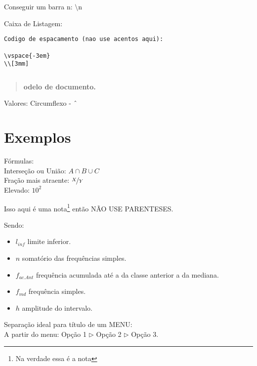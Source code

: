 \documentclass[a4paper,11pt]{article}
\begin{document}
\maketitle %
\thispagestyle{fancy} %

Conseguir um barra n: $\setminus$n

Caixa de Listagem:
\begin{lstlisting}[]
Codigo de espacamento (nao use acentos aqui):

\vspace{-3em}
\\[3mm]
\end{lstlisting}

\begin{lstlisting}[]
\end{lstlisting}

\begin{abstract}
	\textbf{odelo de documento. \lipsum[4-1]}
\end{abstract}

Valores:
Circumflexo - $\string^$

\section{Exemplos}

Fórmulas: \\
Interseção ou União: $A \cap B \cup C$ \\
Fração mais atraente: $\nicefrac{X}{Y}$ \\
Elevado: $10^2$

Isso aqui é uma nota\footnote{Na verdade essa é a nota} então NÃO USE PARENTESES.

Sendo: \vspace{-1em}
\begin{itemize}[nolistsep]
	\item $l_{inf}$ limite inferior.
	\item $n$ somatório das frequências simples.
	\item $f_{ac.Ant}$ frequência acumulada até a da classe anterior a da mediana.
	\item $f_{md}$ frequência simples.
	\item $h$ amplitude do intervalo.
\end{itemize}

Separação ideal para título de um MENU: \\
A partir do menu: Opção 1 $\triangleright$ Opção 2 $\triangleright$ Opção 3.
\end{document}
